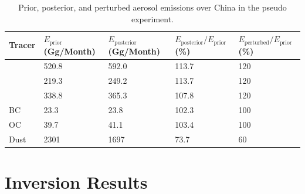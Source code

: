 \begin{table}[t]
  \centering
  \small
  \caption{Prior, posterior, and perturbed aerosol emissions over China in the pseudo experiment.}
  \label{tab:pseudo1}
  \begin{tabular}{m{3em} C{5em} C{5em} C{6em} C{6em}}
    \toprule
    Tracer & $E_\text{prior}$ (Gg/Month) & $E_\text{posterior}$ (Gg/Month)& $E_\text{posterior}/E_\text{prior}$ (\%)& $E_\text{perturbed}/E_\text{prior}$ (\%)\\ 
    \midrule
     & 520.8 & 592.0 & 113.7 & 120 \\
     & 219.3 & 249.2 & 113.7 & 120 \\
     & 338.8 & 365.3 & 107.8 & 120 \\
    BC & 23.3 & 23.8 & 102.3 & 100 \\
    OC & 39.7 & 41.1 & 103.4 & 100 \\
    Dust & 2301 & 1697 & 73.7 & 60 \\ 
    \bottomrule
  \end{tabular}
\end{table}

\section{Inversion Results} \label{sec:invresult}

